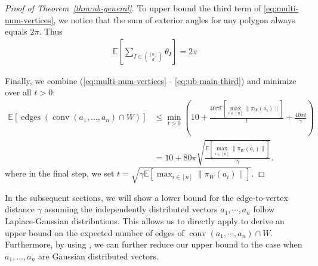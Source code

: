 \documentclass{theoretics}
\newcommand{\E}{\mathbb E}
\newcommand{\conv}{\operatorname{conv}}
\newcommand{\edges}{\operatorname{edges}}
\begin{document}
\begin{proof}[Proof of Theorem~\ref{thm:ub-general}]
    To upper bound the third term of \eqref{eq:multi-num-vertices}, we notice that the sum of exterior angles for any polygon always equals $2\pi$. Thus
    \begin{align}\label{eq:ub-main-third}
        \E[\sum_{I \in \binom{[n]}{d}} \theta_I] = 2\pi
    \end{align}
    
    Finally, we combine (\ref{eq:multi-num-vertices} - \ref{eq:ub-main-third}) and
    minimize over all $t > 0$:
    \begin{align*}
        \E\left[ \edges\left(\conv(a_1, \ldots, a_n) \cap W \right)  \right]
        &\leq \min_{t > 0} \left( 10 + \frac{40\pi \E[\max_{i\in [n]} \|\pi_W(a_i)\|]}{t}
        + \frac{40\pi t}{\gamma}  \right)\\
        &= 10 + 80\pi \sqrt{\frac{\E[\max_{i\in [n]} \|\pi_W(a_i)\|]}{\gamma}}.
    \end{align*}
    where in the final step, we set $t = \sqrt{\gamma \E[\max_{i\in [n]} \|\pi_W(a_i)\|]}$.
\end{proof}


In the subsequent sections, we will show a lower bound for the edge-to-vertex distance $\gamma$ assuming the independently distributed vectors $a_1, \cdots, a_n$ follow Laplace-Gaussian distributions. 
This allows us to directly apply  to derive an upper bound on the expected number of edges of $\conv(a_1, \cdots, a_n) \cap W$. 
Furthermore, by using , we can further reduce our upper bound to the case when $a_1, \dots, a_n$ are Gaussian distributed vectors.





\iffalse
\end{document}
